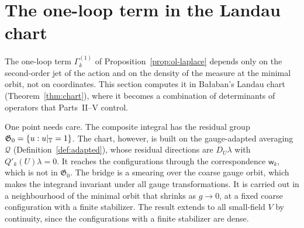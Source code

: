 \section{The one-loop term in the Landau chart}\label{sec:ol-chart}

The one-loop term $\Gamma^{(1)}_k$ of Proposition~\ref{prop:ol-laplace} depends only on the second-order jet of the action and on the density of the measure at the minimal orbit, not on coordinates. This section computes it in Ba\l aban's Landau chart (Theorem~\ref{thm:chart}), where it becomes a combination of determinants of operators that Parts~II--V control.

One point needs care. The composite integral has the residual group $\mathfrak G_0=\{u:u|_\mathbb T=1\}$. The chart, however, is built on the gauge-adapted averaging $\mathcal Q$ (Definition~\ref{def:adapted}), whose residual directions are $D_U\lambda$ with $Q'_k(U)\lambda=0$. It reaches the configurations through the correspondence $\mathsf w_k$, which is not in $\mathfrak G_0$. The bridge is a smearing over the coarse gauge orbit, which makes the integrand invariant under all gauge transformations. It is carried out in a neighbourhood of the minimal orbit that shrinks as $g\to0$, at a fixed coarse configuration with a finite stabilizer. The result extends to all small-field $V$ by continuity, since the configurations with a finite stabilizer are dense.

